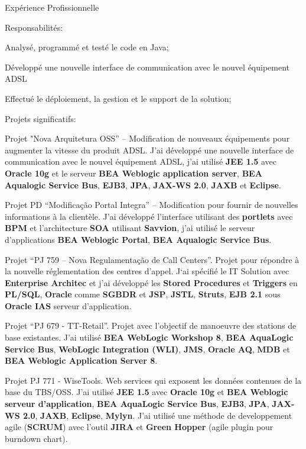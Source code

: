 \documentclass{resume}
\begin{document}
\begin{rSection}{Expérience Profissionnelle}
    \begin{rSubsection}{Responsabilités:}{}{}{}
      \item Analysé, programmé et testé le code en Java;
      \item Développé une nouvelle interface de communication avec le nouvel équipement ADSL
      \item Effectué le déploiement, la gestion et le support de la solution;
    \end{rSubsection}
    \begin{rSubsection}{Projets significatifs:}{}{}{}
    \item Projet "Nova Arquitetura OSS” – Modification de nouveaux équipements pour augmenter la vitesse du produit ADSL. J'ai développé une nouvelle interface de communication avec le nouvel équipement ADSL, j'ai utilisé \textbf{JEE 1.5} avec \textbf{Oracle 10g} et le serveur \textbf{BEA Weblogic application server}, \textbf{BEA Aqualogic Service Bus}, \textbf{EJB3}, \textbf{JPA}, \textbf{JAX-WS 2.0}, \textbf{JAXB} et \textbf{Eclipse}.\\
    \item Projet PD “Modificação Portal Integra” – Modification pour fournir de nouvelles informations à la clientèle. J'ai développé l'interface  utilisant des \textbf{portlets} avec \textbf{BPM} et l'architecture \textbf{SOA} utilisant \textbf{Savvion}, j'ai utilisé le serveur d'applications \textbf{BEA Weblogic Portal}, \textbf{BEA Aqualogic Service Bus}.\\
    \item Projet “PJ 759 – Nova Regulamentação de Call Centers”. Projet pour répondre à la nouvelle réglementation des centres d'appel. J‘ai spécifié le IT Solution avec \textbf{Enterprise Architec} et j'ai développé les \textbf{Stored Procedures} et \textbf{Triggers} en \textbf{PL/SQL}, \textbf{Oracle} comme \textbf{SGBDR} et \textbf{JSP}, \textbf{JSTL}, \textbf{Struts}, \textbf{EJB 2.1} sous \textbf{Oracle IAS} serveur d'application.\\
    \item Projet “PJ 679 - TT-Retail”. Projet avec l’objectif de manoeuvre des stations de base existantes. J’ai utilisé \textbf{BEA WebLogic Workshop 8}, \textbf{BEA AquaLogic Service Bus}, \textbf{WebLogic Integration (WLI)}, \textbf{JMS}, \textbf{Oracle AQ}, \textbf{MDB} et \textbf{BEA Weblogic Application Server 8}.\\
    \item Projet PJ 771 - WiseTools. Web services qui exposent les données contenues de la base du TBS/OSS. J’ai utilisé \textbf{JEE 1.5} avec \textbf{Oracle 10g} et \textbf{BEA Weblogic serveur d'application}, \textbf{BEA AquaLogic Service Bus}, \textbf{EJB3}, \textbf{JPA}, \textbf{JAX-WS 2.0}, \textbf{JAXB}, \textbf{Eclipse}, \textbf{Mylyn}. J'ai utilisé une méthode de developpement agile (\textbf{SCRUM}) avec l'outil \textbf{JIRA} et \textbf{Green Hopper} (agile plugin pour burndown chart).\\

\end{rSubsection}
\end{rSection}
\end{document}

